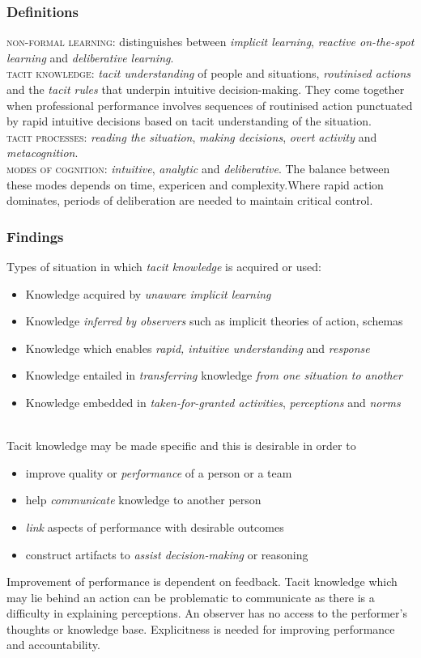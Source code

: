 \documentclass[12pt,a4paper]{article}
\begin{document}
    \subsubsection{Definitions}
      \textsc{non-formal learning}: distinguishes between \emph{implicit learning}, \emph{reactive on-the-spot learning} and \emph{deliberative learning}. \\
      \textsc{tacit knowledge}: \emph{tacit understanding} of people and situations, \emph{routinised actions} and the \emph{tacit rules} that underpin intuitive decision-making. They come together when professional performance involves sequences of routinised action punctuated by rapid intuitive decisions based on tacit understanding of the situation. \\
      \textsc{tacit processes}: \emph{reading the situation}, \emph{making decisions}, \emph{overt activity} and \emph{metacognition}.\\
      \textsc{modes of cognition}: \emph{intuitive}, \emph{analytic} and \emph{deliberative}. The balance between these modes depends on time, expericen and complexity.Where rapid action dominates, periods of deliberation are needed to maintain critical control.
    \subsubsection{Findings}
      Types of situation in which \emph{tacit knowledge} is acquired or used:
      \begin{itemize}
        \item Knowledge acquired by \emph{unaware implicit learning}
        \item Knowledge \emph{inferred by observers} such as implicit theories of action, schemas
        \item Knowledge which enables \emph{rapid, intuitive understanding} and \emph{response}
        \item Knowledge entailed in \emph{transferring} knowledge \emph{from one situation to another}
        \item Knowledge embedded in \emph{taken-for-granted activities}, \emph{perceptions} and \emph{norms}
      \end{itemize}
      \\
      Tacit knowledge may be made specific and this is desirable in order to
      \begin{itemize}
        \item improve quality or \emph{performance} of a person or a team
        \item help \emph{communicate} knowledge to another person
        \item \emph{link} aspects of performance with desirable outcomes
        \item construct artifacts to \emph{assist decision-making} or reasoning
      \end{itemize}
      Improvement of performance is dependent on feedback. Tacit knowledge which may lie behind an action can be problematic to communicate as there is a difficulty in explaining perceptions. An observer has no access to the performer's thoughts or knowledge base. Explicitness is needed for improving performance and accountability.
\end{document}
